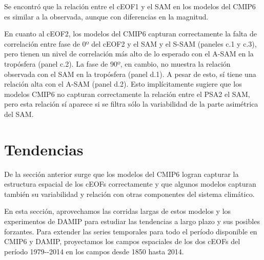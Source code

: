 \documentclass[12pt,oneside,a4paper]{reedthesis}
\begin{document}
Se encontró que la relación entre el cEOF1 y el SAM en los modelos del CMIP6 es similar a la observada, aunque con diferencias en la magnitud.

En cuanto al cEOF2, los modelos del CMIP6 capturan correctamente la falta de correlación entre fase de 0º del cEOF2 y el SAM y el S-SAM (paneles c.1 y c.3), pero tienen un nivel de correlación más alto de lo esperado con el A-SAM en la tropósfera (panel c.2).
La fase de 90º, en cambio, no muestra la relación observada con el SAM en la tropósfera (panel d.1).
A pesar de esto, sí tiene una relación alta con el A-SAM (panel d.2).
Esto implícitamente sugiere que los modelos CMIP6 no capturan correctamente la relación entre el PSA2 el SAM, pero esta relación sí aparece si se filtra sólo la variabilidad de la parte asimétrica del SAM.

\hypertarget{tendencias}{%
\section{Tendencias}\label{tendencias}}

De la sección anterior surge que los modelos del CMIP6 logran capturar la estructura espacial de los cEOFs correctamente y que algunos modelos capturan también su variabilidad y relación con otras componentes del sistema climático.

En esta sección, aprovechamos las corridas largas de estos modelos y los experimentos de DAMIP para estudiar las tendencias a largo plazo y sus posibles forzantes.
Para extender las series temporales para todo el período disponible en CMIP6 y DAMIP, proyectamos los campos espaciales de los dos cEOFs del período 1979-\/-2014 en los campos desde 1850 hasta 2014.
\end{document}
